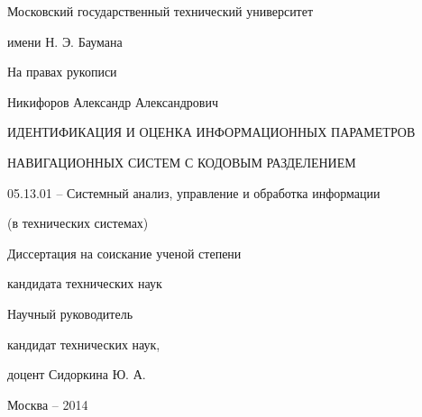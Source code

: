 \noindent\centerline{Московский государственный технический университет}
\noindent\centerline{имени Н. Э. Баумана}
\vspace{\baselineskip}
\vspace{\baselineskip}

\hfill На правах рукописи

\vspace{\baselineskip}
\vspace{\baselineskip}

\noindent\centerline{Никифоров Александр Александрович}

\vspace{\baselineskip}
\vspace{\baselineskip}

\noindent\centerline{ИДЕНТИФИКАЦИЯ И ОЦЕНКА ИНФОРМАЦИОННЫХ ПАРАМЕТРОВ}
\noindent\centerline{НАВИГАЦИОННЫХ СИСТЕМ С КОДОВЫМ РАЗДЕЛЕНИЕМ}

\vspace{\baselineskip}

\noindent\centerline{05.13.01 – Системный анализ, управление и обработка информации}
\noindent\centerline{(в технических системах)}

\vspace{\baselineskip}
\vspace{\baselineskip}

\noindent\centerline{Диссертация на соискание ученой степени}
\noindent\centerline{кандидата технических наук}

\vspace{\baselineskip}
\vspace{\baselineskip}

\hfill{Научный руководитель}

\hfill{кандидат технических наук,}

\hfill{доцент Сидоркина Ю. А.}

\vfill
\noindent\centerline{Москва – 2014}

\clearpage
